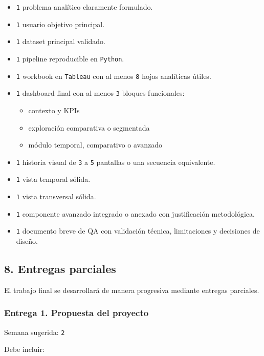 \documentclass[
]{article}
\providecommand{\tightlist}{%
  \setlength{\itemsep}{0pt}\setlength{\parskip}{0pt}}
\begin{document}
\begin{itemize}
\tightlist
\item
  \texttt{1} problema analítico claramente formulado.
\item
  \texttt{1} usuario objetivo principal.
\item
  \texttt{1} dataset principal validado.
\item
  \texttt{1} pipeline reproducible en \texttt{Python}.
\item
  \texttt{1} workbook en \texttt{Tableau} con al menos \texttt{8} hojas
  analíticas útiles.
\item
  \texttt{1} dashboard final con al menos \texttt{3} bloques
  funcionales:

  \begin{itemize}
  \tightlist
  \item
    contexto y KPIs
  \item
    exploración comparativa o segmentada
  \item
    módulo temporal, comparativo o avanzado
  \end{itemize}
\item
  \texttt{1} historia visual de \texttt{3} a \texttt{5} pantallas o una
  secuencia equivalente.
\item
  \texttt{1} vista temporal sólida.
\item
  \texttt{1} vista transversal sólida.
\item
  \texttt{1} componente avanzado integrado o anexado con justificación
  metodológica.
\item
  \texttt{1} documento breve de QA con validación técnica, limitaciones
  y decisiones de diseño.
\end{itemize}

\subsection{8. Entregas parciales}\label{8-entregas-parciales}

El trabajo final se desarrollará de manera progresiva mediante entregas
parciales.

\subsubsection{Entrega 1. Propuesta del
proyecto}\label{entrega-1-propuesta-del-proyecto}

Semana sugerida: \texttt{2}

Debe incluir:
\end{document}
